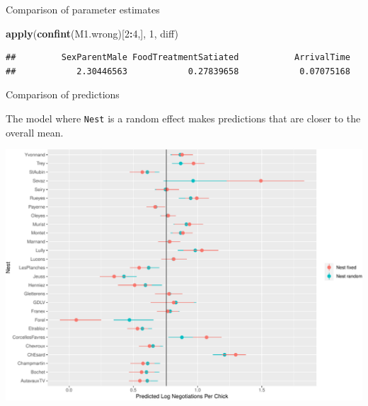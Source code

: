\documentclass[
  ignorenonframetext,
]{beamer}
\newenvironment{Shaded}{\begin{snugshade}}{\end{snugshade}}
\newcommand{\DecValTok}[1]{\textcolor[rgb]{0.00,0.00,0.81}{#1}}
\newcommand{\KeywordTok}[1]{\textcolor[rgb]{0.13,0.29,0.53}{\textbf{#1}}}
\newcommand{\NormalTok}[1]{#1}
\newcommand{\OperatorTok}[1]{\textcolor[rgb]{0.81,0.36,0.00}{\textbf{#1}}}
\begin{document}
\begin{frame}[fragile]{Comparison of parameter estimates}
\begin{Shaded}
\begin{Highlighting}[]
\KeywordTok{apply}\NormalTok{(}\KeywordTok{confint}\NormalTok{(M1.wrong)[}\DecValTok{2}\OperatorTok{:}\DecValTok{4}\NormalTok{,], }\DecValTok{1}\NormalTok{, diff)}
\end{Highlighting}
\end{Shaded}

\begin{verbatim}
##         SexParentMale FoodTreatmentSatiated           ArrivalTime 
##            2.30446563            0.27839658            0.07075168
\end{verbatim}

\end{frame}

\begin{frame}[fragile]{Comparison of predictions}
\protect\hypertarget{comparison-of-predictions}{}

The model where \texttt{Nest} is a random effect makes predictions that
are closer to the overall mean.

\includegraphics{mixed_models_files/figure-beamer/unnamed-chunk-20-1.pdf}

\end{frame}
\end{document}
